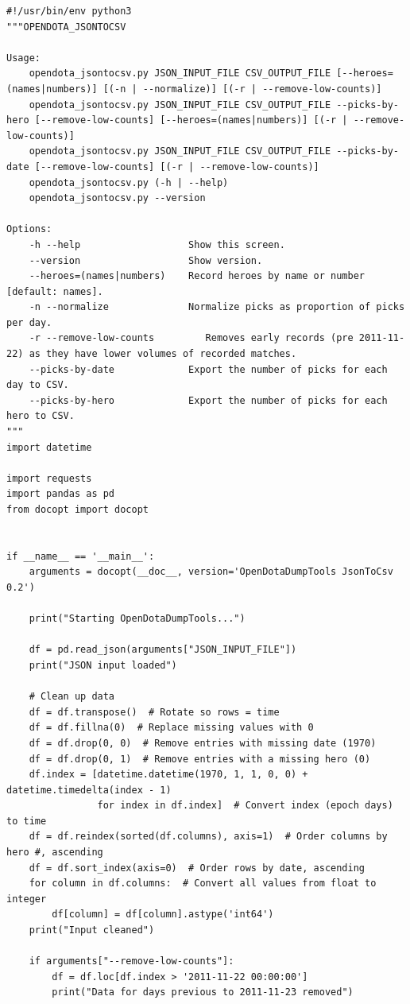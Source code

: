\begin{verbatim}
#!/usr/bin/env python3
"""OPENDOTA_JSONTOCSV

Usage:
    opendota_jsontocsv.py JSON_INPUT_FILE CSV_OUTPUT_FILE [--heroes=(names|numbers)] [(-n | --normalize)] [(-r | --remove-low-counts)]
    opendota_jsontocsv.py JSON_INPUT_FILE CSV_OUTPUT_FILE --picks-by-hero [--remove-low-counts] [--heroes=(names|numbers)] [(-r | --remove-low-counts)]
    opendota_jsontocsv.py JSON_INPUT_FILE CSV_OUTPUT_FILE --picks-by-date [--remove-low-counts] [(-r | --remove-low-counts)]
    opendota_jsontocsv.py (-h | --help)
    opendota_jsontocsv.py --version

Options:
    -h --help                   Show this screen.
    --version                   Show version.
    --heroes=(names|numbers)    Record heroes by name or number [default: names].
    -n --normalize              Normalize picks as proportion of picks per day.
    -r --remove-low-counts         Removes early records (pre 2011-11-22) as they have lower volumes of recorded matches.
    --picks-by-date             Export the number of picks for each day to CSV.
    --picks-by-hero             Export the number of picks for each hero to CSV.
"""
import datetime

import requests
import pandas as pd
from docopt import docopt


if __name__ == '__main__':
    arguments = docopt(__doc__, version='OpenDotaDumpTools JsonToCsv 0.2')

    print("Starting OpenDotaDumpTools...")

    df = pd.read_json(arguments["JSON_INPUT_FILE"])
    print("JSON input loaded")

    # Clean up data
    df = df.transpose()  # Rotate so rows = time
    df = df.fillna(0)  # Replace missing values with 0
    df = df.drop(0, 0)  # Remove entries with missing date (1970)
    df = df.drop(0, 1)  # Remove entries with a missing hero (0)
    df.index = [datetime.datetime(1970, 1, 1, 0, 0) + datetime.timedelta(index - 1)
                for index in df.index]  # Convert index (epoch days) to time
    df = df.reindex(sorted(df.columns), axis=1)  # Order columns by hero #, ascending
    df = df.sort_index(axis=0)  # Order rows by date, ascending
    for column in df.columns:  # Convert all values from float to integer
        df[column] = df[column].astype('int64')
    print("Input cleaned")

    if arguments["--remove-low-counts"]:
        df = df.loc[df.index > '2011-11-22 00:00:00']
        print("Data for days previous to 2011-11-23 removed")


\end{verbatim}
